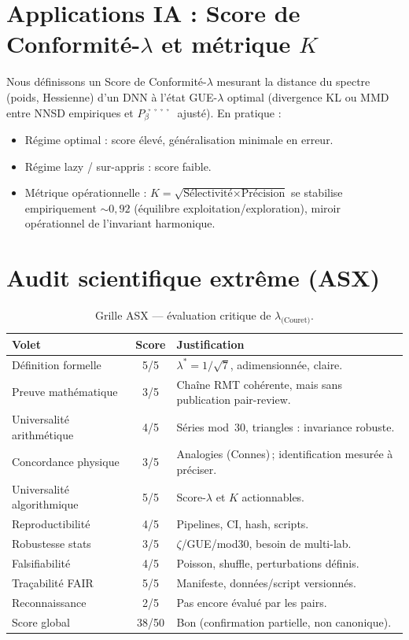\documentclass[11pt,a4paper]{article}
\def\lambda{λ}%
\def\beta{β̉̉̉̉}%
\def\textbf#1{#1}%
\def\emph#1{#1}%
\begin{document}
\section{Applications IA : Score de Conformité-\texorpdfstring{$\lambda$}{lambda} et métrique \texorpdfstring{$K$}{K}}
Nous définissons un \emph{Score de Conformité-$\lambda$} mesurant la distance du spectre (poids, Hessienne) d’un DNN à l’état GUE-$\lambda$ optimal (divergence KL ou MMD entre NNSD empiriques et $P_\beta$ ajusté).
En pratique :
\begin{itemize}
  \item \textbf{Régime optimal} : score élevé, généralisation minimale en erreur.
  \item \textbf{Régime lazy / sur-appris} : score faible.
  \item \textbf{Métrique opérationnelle} : $K=\sqrt{\text{Sélectivité}\times\text{Précision}}$ se stabilise empiriquement $\sim 0{,}92$ (équilibre exploitation/exploration), miroir opérationnel de l’invariant harmonique.
\end{itemize}

\section{Audit scientifique extrême (ASX)}
\begin{table}[H]
\centering
\small
\begin{tabular}{p{4.8cm} c p{9cm}}
\toprule
\textbf{Volet} & \textbf{Score} & \textbf{Justification}\\
\midrule
Définition formelle & 5/5 & $\lambda^\ast = 1/\sqrt{7}$, adimensionnée, claire.\\
Preuve mathématique & 3/5 & Chaîne RMT cohérente, mais sans publication pair-review.\\
Universalité arithmétique & 4/5 & Séries mod~30, triangles : invariance robuste.\\
Concordance physique & 3/5 & Analogies (Connes)\,; identification mesurée à préciser.\\
Universalité algorithmique & 5/5 & Score-$\lambda$ et $K$ actionnables.\\
Reproductibilité & 4/5 & Pipelines, CI, hash, scripts.\\
Robustesse stats & 3/5 & $ζ$/GUE/mod30, besoin de multi-lab.\\
Falsifiabilité & 4/5 & Poisson, shuffle, perturbations définis.\\
Traçabilité FAIR & 5/5 & Manifeste, données/script versionnés.\\
Reconnaissance & 2/5 & Pas encore évalué par les pairs.\\
\midrule
\textbf{Score global} & \textbf{38/50} & Bon (confirmation partielle, non canonique).\\
\bottomrule
\end{tabular}
\caption{Grille ASX — évaluation critique de $\lambda_{\text{(Couret)}}$.}
\end{table}
\end{document}
